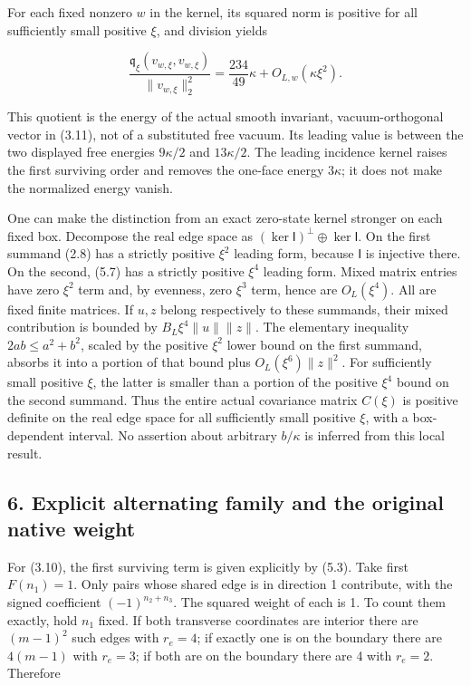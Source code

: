 \documentclass[
  11pt,
]{article}
\begin{document}
For each fixed nonzero \(w\) in the kernel, its squared norm is positive
for all sufficiently small positive \(\xi\), and division yields

\[
\boxed{
\frac{\mathfrak q_\xi(v_{w,\xi},v_{w,\xi})}{\|v_{w,\xi}\|_2^2}
=\frac{234}{49}\kappa+O_{L,w}(\kappa\xi^2).}
\tag{5.8}
\]

This quotient is the energy of the actual smooth invariant,
vacuum-orthogonal vector in (3.11), not of a substituted free vacuum.
Its leading value is between the two displayed free energies
\(9\kappa/2\) and \(13\kappa/2\). The leading incidence kernel raises
the first surviving order and removes the one-face energy \(3\kappa\);
it does not make the normalized energy vanish.

One can make the distinction from an exact zero-state kernel stronger on
each fixed box. Decompose the real edge space as
\((\ker\mathsf I)^\perp\oplus\ker\mathsf I\). On the first summand (2.8)
has a strictly positive \(\xi^2\) leading form, because \(\mathsf I\) is
injective there. On the second, (5.7) has a strictly positive \(\xi^4\)
leading form. Mixed matrix entries have zero \(\xi^2\) term and, by
evenness, zero \(\xi^3\) term, hence are \(O_L(\xi^4)\). All are fixed
finite matrices. If \(u,z\) belong respectively to these summands, their
mixed contribution is bounded by \(B_L\xi^4\|u\|\|z\|\). The elementary
inequality \(2ab\le a^2+b^2\), scaled by the positive \(\xi^2\) lower
bound on the first summand, absorbs it into a portion of that bound plus
\(O_L(\xi^6)\|z\|^2\). For sufficiently small positive \(\xi\), the
latter is smaller than a portion of the positive \(\xi^4\) bound on the
second summand. Thus the entire actual covariance matrix \(C(\xi)\) is
positive definite on the real edge space for all sufficiently small
positive \(\xi\), with a box-dependent interval. No assertion about
arbitrary \(b/\kappa\) is inferred from this local result.

\subsection{6. Explicit alternating family and the original native
weight}\label{magnetic-part-4-explicit-alternating-family-and-the-original-native-weight}

For (3.10), the first surviving term is given explicitly by (5.3). Take
first \(F(n_1)=1\). Only pairs whose shared edge is in direction 1
contribute, with the signed coefficient \((-1)^{n_2+n_3}\). The squared
weight of each is 1. To count them exactly, hold \(n_1\) fixed. If both
transverse coordinates are interior there are \((m-1)^2\) such edges
with \(r_e=4\); if exactly one is on the boundary there are \(4(m-1)\)
with \(r_e=3\); if both are on the boundary there are 4 with \(r_e=2\).
Therefore
\end{document}
